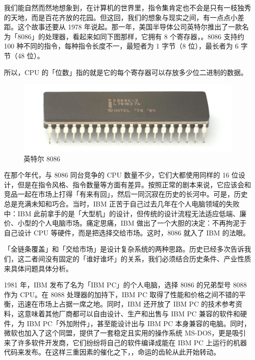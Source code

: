 我们能自然而然地想象到，在计算机的世界里，指令集肯定也不会是只有一枝独秀的天地，而是百花齐放的花园。但这回，我们的想象与现实之间，有一点点小差距。这个故事还要从 1978 年说起。那一年，美国半导体公司英特尔推出了一款名为「8086」的处理器，看起来如同下图那样，它拥有 8 个寄存器，。8086 支持约 100 种不同的指令，每种指令长度不一，最短者为 1 字节（8 位），最长者为 6 字节（48 位）。

\begin{note}
  所以，CPU 的「位数」指的就是它的每个寄存器可以存放多少位二进制的数据。
\end{note}

\begin{figure}[htb!]
  \centering
  \includegraphics[width=.7\textwidth]{assets/surpass/8086.png}
  
  \caption{英特尔 8086}
  \label{fig:8086}
\end{figure}

在那个年代，与 8086 同台竞争的 CPU 数量不少，它们大都使用同样的 16 位设计，但是在指令风格、指令数量等方面有差异。按照正常的剧本来说，它应该会和竞品一起在市场上打得「有来有回」，然后一同沉寂在历史的长河中。可是，历史总是充满未知和巧合。当时，IBM 正苦于自己过去几年在个人电脑领域的失败中：IBM 此前拿手的是「大型机」的设计，但传统的设计流程无法适应低端、廉价、小型的个人电脑市场。痛定思痛，IBM 做出了一个大胆的决定：不再拘泥于自己设计 CPU 等硬件，而是把选择交给市场。这时，8086 就入了 IBM 的法眼。

\begin{note}
  「全链条覆盖」和「交给市场」是设计复杂系统的两种思路。历史已经多次告诉我们，这二者间没有固定的「谁好谁坏」的关系，我们必须结合历史条件、产业性质来具体问题具体分析。
\end{note}

1981 年，IBM 发布了名为「IBM PC」的个人电脑，选择 8086 的兄弟型号 8088 作为 CPU。在 8088 处理器的加持下，IBM PC 取得了性能和价格之间不错的平衡，迅速在市场上占据一席之地。同时，IBM 还开放了 IBM PC 的技术参考资料，这意味着其他厂商都可以自由设计、生产和出售与 IBM PC 兼容的软件和硬件，为 IBM PC「外加附件」，甚至能设计出与 IBM PC 本身兼容的电脑。同时，微软也加入了这个同盟，提供了一套稳定且实用的操作系统 MS-DOS，更是吸引来了许多软件开发商，它们纷纷将自己的软件编译成能在 IBM PC 上运行的机器代码来发布。在这样三重因素的催化之下，，命运的齿轮从此开始转动。


